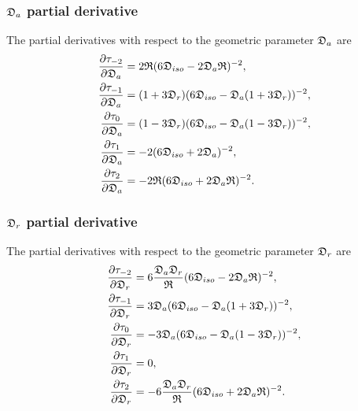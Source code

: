 \subsubsection{$\mathfrak{D}_a$ partial derivative}

The partial derivatives with respect to the geometric parameter $\mathfrak{D}_a$ are
\begin{subequations}
\begin{align}
    \frac{\partial \tau_{-2}}{\partial \mathfrak{D}_a} &= 2\mathfrak{R} (6\mathfrak{D}_{iso} - 2\mathfrak{D}_a\mathfrak{R})^{-2}, \\
    \frac{\partial \tau_{-1}}{\partial \mathfrak{D}_a} &= (1 + 3\mathfrak{D}_r) (6\mathfrak{D}_{iso} - \mathfrak{D}_a (1 + 3\mathfrak{D}_r))^{-2}, \\
    \frac{\partial \tau_{0}}{\partial \mathfrak{D}_a}  &= (1 - 3\mathfrak{D}_r) (6\mathfrak{D}_{iso} - \mathfrak{D}_a (1 - 3\mathfrak{D}_r))^{-2}, \\
    \frac{\partial \tau_{1}}{\partial \mathfrak{D}_a}  &= -2 (6\mathfrak{D}_{iso} + 2\mathfrak{D}_a)^{-2}, \\
    \frac{\partial \tau_{2}}{\partial \mathfrak{D}_a}  &= -2\mathfrak{R} (6\mathfrak{D}_{iso} + 2\mathfrak{D}_a\mathfrak{R})^{-2}.
\end{align}
\end{subequations}



\subsubsection{$\mathfrak{D}_r$ partial derivative}

The partial derivatives with respect to the geometric parameter $\mathfrak{D}_r$ are
\begin{subequations}
\begin{align}
    \frac{\partial \tau_{-2}}{\partial \mathfrak{D}_r} &= 6\frac{\mathfrak{D}_a \mathfrak{D}_r}{\mathfrak{R}} (6\mathfrak{D}_{iso} - 2\mathfrak{D}_a\mathfrak{R})^{-2}, \\
    \frac{\partial \tau_{-1}}{\partial \mathfrak{D}_r} &= 3\mathfrak{D}_a (6\mathfrak{D}_{iso} - \mathfrak{D}_a (1 + 3\mathfrak{D}_r))^{-2}, \\
    \frac{\partial \tau_{0}}{\partial \mathfrak{D}_r}  &= -3\mathfrak{D}_a (6\mathfrak{D}_{iso} - \mathfrak{D}_a (1 - 3\mathfrak{D}_r))^{-2}, \\
    \frac{\partial \tau_{1}}{\partial \mathfrak{D}_r}  &= 0, \\
    \frac{\partial \tau_{2}}{\partial \mathfrak{D}_r}  &= -6\frac{\mathfrak{D}_a \mathfrak{D}_r}{\mathfrak{R}} (6\mathfrak{D}_{iso} + 2\mathfrak{D}_a\mathfrak{R})^{-2}.
\end{align}
\end{subequations}



